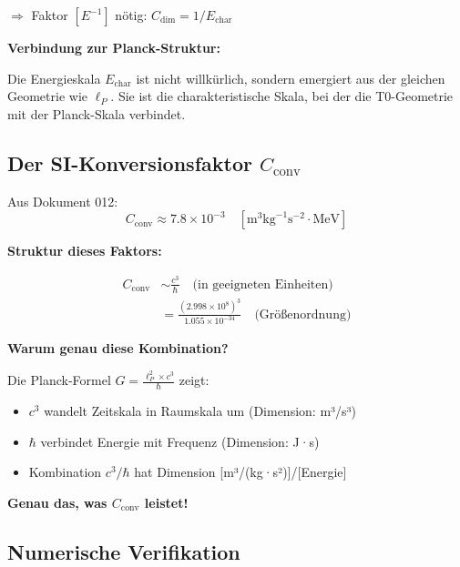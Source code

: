 	$\Rightarrow$ Faktor $[E^{-1}]$ nötig: $C_{\text{dim}} = 1/E_{\text{char}}$
	
	\textbf{Verbindung zur Planck-Struktur:}
	
	Die Energieskala $E_{\text{char}}$ ist nicht willkürlich, sondern emergiert aus der gleichen Geometrie wie $\ell_P$. Sie ist die charakteristische Skala, bei der die T0-Geometrie mit der Planck-Skala verbindet.
	
	\subsection{Der SI-Konversionsfaktor $C_{\text{conv}}$}
	
	Aus Dokument 012:
	\begin{equation}
		C_{\text{conv}} \approx 7.8 \times 10^{-3} \quad [\text{m}^3 \text{kg}^{-1} \text{s}^{-2} \cdot \text{MeV}]
	\end{equation}
	
	\textbf{Struktur dieses Faktors:}
	
	\begin{align}
		C_{\text{conv}} &\sim \frac{c^3}{\hbar} \quad \text{(in geeigneten Einheiten)} \\
		&= \frac{(2.998 \times 10^8)^3}{1.055 \times 10^{-34}} \quad \text{(Größenordnung)}
	\end{align}
	
	\textbf{Warum genau diese Kombination?}
	
	Die Planck-Formel $G = \frac{\ell_P^2 \times c^3}{\hbar}$ zeigt:
	\begin{itemize}
		\item $c^3$ wandelt Zeitskala in Raumskala um (Dimension: m³/s³)
		\item $\hbar$ verbindet Energie mit Frequenz (Dimension: J·s)
		\item Kombination $c^3/\hbar$ hat Dimension [m³/(kg·s²)]/[Energie]
	\end{itemize}
	
	\textbf{Genau das, was $C_{\text{conv}}$ leistet!}
	
	\subsection{Numerische Verifikation}
	
